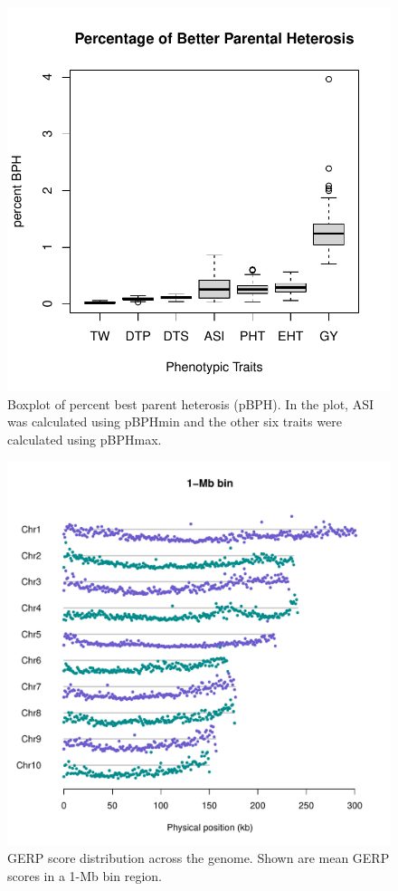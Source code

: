 \documentclass[9pt,twocolumn,twoside]{gsajnl}
\begin{document}
\begin{figure}[htbp]
\centering
\includegraphics[width=\linewidth]{SFig_pBPH.pdf}
\caption{Boxplot of percent best parent heterosis (pBPH). In the plot, ASI was calculated using pBPHmin and the other six traits were calculated using pBPHmax.}
\label{fig:pBPH}
\end{figure}

\begin{figure}[htbp]
\centering
\includegraphics[width=\linewidth]{SFig_gerp_dis1m.pdf}
\caption{GERP score distribution across the genome. Shown are mean GERP scores in a 1-Mb bin region.}
\label{fig:dis1m}
\end{figure}
\end{document}
